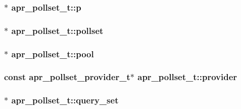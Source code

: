 \subsubsection[{\texorpdfstring{p}{p}}]{$\ast$ apr\+\_\+pollset\+\_\+t\+::p}\hypertarget{structapr__pollset__t_a3f8411536cd6a23826a9cebf1328dddf}{}\label{structapr__pollset__t_a3f8411536cd6a23826a9cebf1328dddf}
\subsubsection[{\texorpdfstring{pollset}{pollset}}]{$\ast$ apr\+\_\+pollset\+\_\+t\+::pollset}\hypertarget{structapr__pollset__t_a540fcf5810832d74db2cec3efc96fe51}{}\label{structapr__pollset__t_a540fcf5810832d74db2cec3efc96fe51}
\subsubsection[{\texorpdfstring{pool}{pool}}]{ $\ast$ apr\+\_\+pollset\+\_\+t\+::pool}\hypertarget{structapr__pollset__t_af9b340dfee1237e5d5c5df6db819e87c}{}\label{structapr__pollset__t_af9b340dfee1237e5d5c5df6db819e87c}
\subsubsection[{\texorpdfstring{provider}{provider}}]{\setlength{\rightskip}{0pt plus 5cm}const {\bf apr\+\_\+pollset\+\_\+provider\+\_\+t}$\ast$ apr\+\_\+pollset\+\_\+t\+::provider}\hypertarget{structapr__pollset__t_a229a818838e66f79744539233d326bd0}{}\label{structapr__pollset__t_a229a818838e66f79744539233d326bd0}
\subsubsection[{\texorpdfstring{query\+\_\+set}{query_set}}]{$\ast$ apr\+\_\+pollset\+\_\+t\+::query\+\_\+set}\hypertarget{structapr__pollset__t_ab898b7d6794516fb343cb16845ed61d8}{}\label{structapr__pollset__t_ab898b7d6794516fb343cb16845ed61d8}
